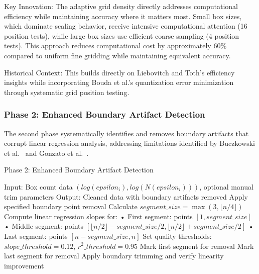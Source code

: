 \documentclass[preprint,12pt]{elsarticle}
\def\textbf#1{#1}%
\def\epsilon{epsilon}%
\begin{document}
\textbf{Key Innovation}: The adaptive grid density directly addresses computational efficiency while maintaining accuracy where it matters most. Small box sizes, which dominate scaling behavior, receive intensive computational attention (16 position tests), while large box sizes use efficient coarse sampling (4 position tests). This approach reduces computational cost by approximately 60\% compared to uniform fine gridding while maintaining equivalent accuracy.

\textbf{Historical Context}: This builds directly on Liebovitch and Toth's efficiency insights while incorporating Bouda et al.'s quantization error minimization through systematic grid position testing.

\subsubsection{Phase 2: Enhanced Boundary Artifact Detection}

The second phase systematically identifies and removes boundary artifacts that corrupt linear regression analysis, addressing limitations identified by Buczkowski et al.~\cite{buczkowski1998} and Gonzato et al.~\cite{gonzato1998}.

\begin{algorithm}[!htbp]
\caption{Phase 2: Enhanced Boundary Artifact Detection}
\begin{algorithmic}[1]
\State \textbf{Input:} Box count data $(log(\epsilon_i), log(N(\epsilon_i)))$, optional manual trim parameters
\State \textbf{Output:} Cleaned data with boundary artifacts removed
\State
{}
    \State Apply specified boundary point removal
\EndIf
\State
{}
    \State Calculate $segment\_size = \max(3, \lfloor n/4 \rfloor)$
    \State Compute linear regression slopes for:
    \State \hspace{1em} • First segment: points $[1, segment\_size]$
    \State \hspace{1em} • Middle segment: points $[\lfloor n/2 \rfloor - segment\_size/2, \lfloor n/2 \rfloor + segment\_size/2]$
    \State \hspace{1em} • Last segment: points $[n - segment\_size, n]$
    \State
    \State Set quality thresholds: $slope\_threshold = 0.12$, $r^2\_threshold = 0.95$
    \State
        \State Mark first segment for removal
    \EndIf
        \State Mark last segment for removal
    \EndIf
    \State
    \State Apply boundary trimming and verify linearity improvement
\EndIf
\end{algorithmic}
\end{algorithm}
\end{document}
